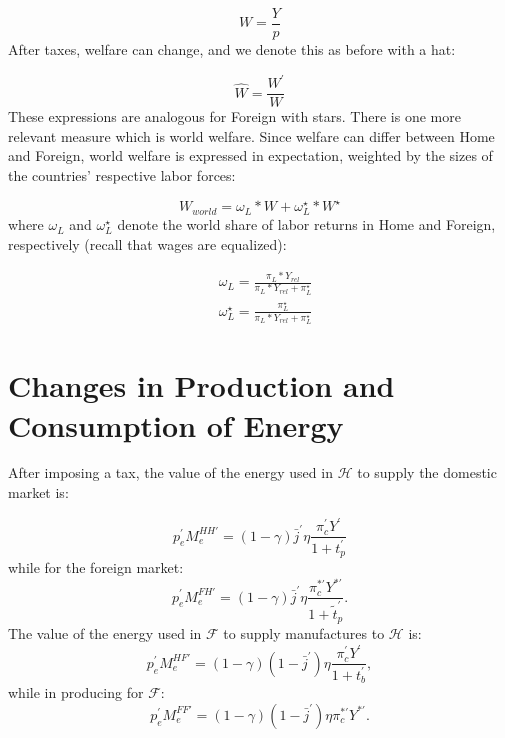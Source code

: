 \documentclass[notitlepage,12pt]{article}
\begin{document}
\begin{equation*}
W = \frac{Y}{p}
\end{equation*}
After taxes, welfare can change, and we denote this as before with a hat:

\begin{equation*}
\hat{W} = \frac{W^\prime}{W}
\end{equation*}
These expressions are analogous for Foreign with stars. There is one more relevant measure which is world welfare. Since welfare can differ between Home and Foreign, world welfare is expressed in expectation, weighted by the sizes of the countries' respective labor forces:

\begin{equation}
W_{world} = \omega_L*W + \omega_L^\star*W^\star
\end{equation}
where $\omega_L$ and $\omega_L^\star$ denote the world share of labor returns in Home and Foreign, respectively (recall that wages are equalized):

\begin{align}
&\omega_L = \frac{\pi_L*Y_{rel}}{\pi_L*Y_{rel} + \pi_L^\star}\\
&\omega_L^\star = \frac{\pi_L^\star}{\pi_L*Y_{rel} + \pi_L^\star}
\end{align}

\section{Changes in Production and Consumption of Energy}

After imposing a tax,  the value of the energy used in $\mathcal{H}$
to supply the domestic market is:

\begin{equation*}
p_{e}^{\prime }M_{e}^{HH\prime }=\left( 1-\gamma \right) \bar{j}^{\prime
}\eta \frac{\pi _{c}^{\prime }Y^{\prime }}{1+t_{p}^{\prime }}
\end{equation*}%
while for the foreign market:%
\begin{equation*}
p_{e}^{\prime }M_{e}^{FH\prime }=\left( 1-\gamma \right) \bar{j}^{\prime
}\eta \frac{\pi _{c}^{\ast \prime }Y^{\ast \prime }}{1+\tilde{t}_{p}^{\prime
}}.
\end{equation*}%
The value of the energy used in $\mathcal{F}$ to supply manufactures to $%
\mathcal{H}$ is:%
\begin{equation*}
p_{e}^{\prime }M_{e}^{HF\prime }=\left( 1-\gamma \right) \left( 1-\bar{j}%
^{\prime }\right) \eta \frac{\pi _{c}^{\prime }Y^{\prime }}{1+t_{b}^{\prime }%
},
\end{equation*}%
while in producing for $\mathcal{F}$:%
\begin{equation*}
p_{e}^{\prime }M_{e}^{FF\prime }=\left( 1-\gamma \right) \left( 1-\bar{j}%
^{\prime }\right) \eta \pi _{c}^{\ast \prime }Y^{\ast \prime }.
\end{equation*}%
\end{document}
